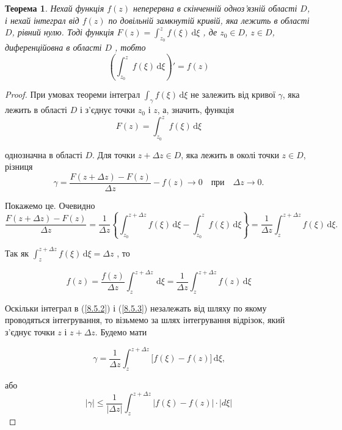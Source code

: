 \documentclass[12pt,fleqn]{article}
\theoremstyle{theorem}
\newtheorem{thm}{Теорема}[section]
\theoremstyle{proof}
\numberwithin{figure}{section}
\numberwithin{equation}{section}
\begin{document}
\begin{thm}\label{theor_8.5.1}
Нехай функція $f(z)$ неперервна в скінченній одноз'язній області $D$, і нехай інтеграл від $f(z)$ по довільній замкнутій кривій, яка лежить в області $D$, рівний нулю. Тоді функція $F(z)= \int_{z_0}^{z} f(\xi) \,\mathrm{d}\xi$ , де $z_0 \in D$, $z \in D$, диференційовна в області $D$ , тобто
\[ \left(\int_{z_0}^{z} f(\xi) \,\mathrm{d}\xi\right)' = f(z) \]

\end{thm}

\begin{proof}
При умовах теореми інтеграл  \(\int_{\gamma} f(\xi) \,\mathrm{d}\xi \) не залежить від кривої $\gamma$, яка лежить в області $D$ і з'єднує точки $z_0$ і $z$, а, значить, функція
\[ F(z) = \int_{z_0}^{z} f(\xi) \,\mathrm{d}\xi \]

однозначна в області $D$. Для точки $z+ \Delta z\in D$, яка лежить в околі точки $z \in D$, різниця
\[ \gamma = \frac{F(z+\Delta z)-F(z)}{\Delta z} - f(z) \longrightarrow 0 \quad \text{при} \quad \Delta z \rightarrow 0. \]

Покажемо це. Очевидно
\begin{equation}\label{8.5.2}
\frac{F(z+\Delta z) - F(z)}{\Delta z} = \frac{1}{\Delta z} \left\{ \int_{z_0}^{z+\Delta z} f(\xi) \,\mathrm{d}\xi - \int_{z_0}^{z} f(\xi) \,\mathrm{d}\xi \right\} = \frac{1}{\Delta z} \int_{z}^{z+\Delta z} f(\xi) \,\mathrm{d}\xi.
\end{equation}

Так як $\int_{z}^{z+\Delta z} f(\xi) \,\mathrm{d}\xi = \Delta z $ , то

\begin{equation}\label{8.5.3}
f(z) = \frac{f(z)}{\Delta z} \int_{z}^{z+\Delta z} \,\mathrm{d}\xi = \frac{1}{\Delta z} \int_{z}^{z+\Delta z} f(z) \,\mathrm{d}\xi
\end{equation}

Оскільки інтеграл в (\ref{8.5.2}) і (\ref{8.5.3}) незалежать від шляху по якому проводяться інтегрування, то візьмемо за шлях інтегрування відрізок, який з'єднує точки $z$ і $z+\Delta z$. Будемо мати

\[ \gamma = \frac{1}{\Delta z} \int_{z}^{z+\Delta z}\bigg[ f(\xi) - f(z) \bigg] \,\mathrm{d}\xi \text{,} \]

або
\begin{equation}\label{8.5.4}
|\gamma| \leq \frac{1}{|\Delta z|} \int_{z}^{z+\Delta z}\bigg| f(\xi) - f(z) \bigg|\cdot|d\xi|
\end{equation}


\end{proof}
\end{document}
